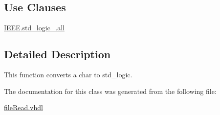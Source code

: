 \subsection*{Use Clauses}
 \begin{DoxyCompactItemize}
\item 
\hypertarget{classfile_read_a15bb3e73d905716d3f089eda6c1cb112}{\hyperlink{classfile_read_a15bb3e73d905716d3f089eda6c1cb112}{I\-E\-E\-E.\-std\-\_\-logic\-\_.\-all}   }\label{classfile_read_a15bb3e73d905716d3f089eda6c1cb112}

\end{DoxyCompactItemize}


\subsection{Detailed Description}
This function converts a char to std\-\_\-logic. 

The documentation for this class was generated from the following file\-:\begin{DoxyCompactItemize}
\item 
\hyperlink{file_read_8vhdl}{file\-Read.\-vhdl}\end{DoxyCompactItemize}
